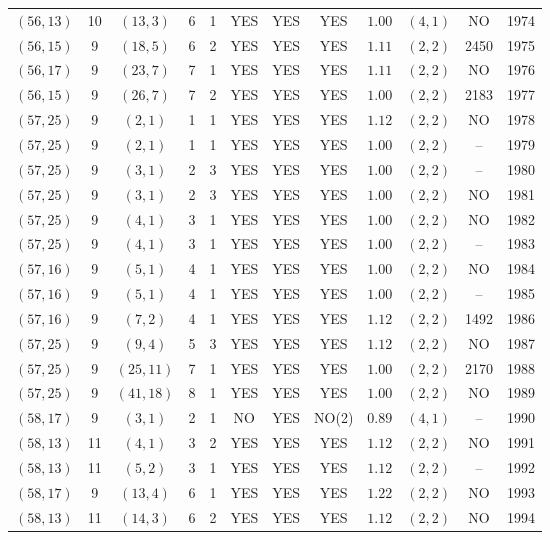 \begin{longtable}{|c|c|c|c|c|c|c|c|c|c|c|c|}
$(56,13)$ & 10 & $(13,3)$ & 6 & 1 & YES & YES & YES & $1.00$ & $(4,1)$ & NO & 1974\\
$(56,15)$ & 9 & $(18,5)$ & 6 & 2 & YES & YES & YES & $1.11$ & $(2,2)$ & 2450 & 1975\\
$(56,17)$ & 9 & $(23,7)$ & 7 & 1 & YES & YES & YES & $1.11$ & $(2,2)$ & NO & 1976\\
$(56,15)$ & 9 & $(26,7)$ & 7 & 2 & YES & YES & YES & $1.00$ & $(2,2)$ & 2183 & 1977\\
$(57,25)$ & 9 & $(2,1)$ & 1 & 1 & YES & YES & YES & $1.12$ & $(2,2)$ & NO & 1978\\
$(57,25)$ & 9 & $(2,1)$ & 1 & 1 & YES & YES & YES & $1.00$ & $(2,2)$ & -- & 1979\\
$(57,25)$ & 9 & $(3,1)$ & 2 & 3 & YES & YES & YES & $1.00$ & $(2,2)$ & -- & 1980\\
$(57,25)$ & 9 & $(3,1)$ & 2 & 3 & YES & YES & YES & $1.00$ & $(2,2)$ & NO & 1981\\
$(57,25)$ & 9 & $(4,1)$ & 3 & 1 & YES & YES & YES & $1.00$ & $(2,2)$ & NO & 1982\\
$(57,25)$ & 9 & $(4,1)$ & 3 & 1 & YES & YES & YES & $1.00$ & $(2,2)$ & -- & 1983\\
$(57,16)$ & 9 & $(5,1)$ & 4 & 1 & YES & YES & YES & $1.00$ & $(2,2)$ & NO & 1984\\
$(57,16)$ & 9 & $(5,1)$ & 4 & 1 & YES & YES & YES & $1.00$ & $(2,2)$ & -- & 1985\\
$(57,16)$ & 9 & $(7,2)$ & 4 & 1 & YES & YES & YES & $1.12$ & $(2,2)$ & 1492 & 1986\\
$(57,25)$ & 9 & $(9,4)$ & 5 & 3 & YES & YES & YES & $1.12$ & $(2,2)$ & NO & 1987\\
$(57,25)$ & 9 & $(25,11)$ & 7 & 1 & YES & YES & YES & $1.00$ & $(2,2)$ & 2170 & 1988\\
$(57,25)$ & 9 & $(41,18)$ & 8 & 1 & YES & YES & YES & $1.00$ & $(2,2)$ & NO & 1989\\
$(58,17)$ & 9 & $(3,1)$ & 2 & 1 & NO & YES & NO(2) & $0.89$ & $(4,1)$ & -- & 1990\\
$(58,13)$ & 11 & $(4,1)$ & 3 & 2 & YES & YES & YES & $1.12$ & $(2,2)$ & NO & 1991\\
$(58,13)$ & 11 & $(5,2)$ & 3 & 1 & YES & YES & YES & $1.12$ & $(2,2)$ & -- & 1992\\
$(58,17)$ & 9 & $(13,4)$ & 6 & 1 & YES & YES & YES & $1.22$ & $(2,2)$ & NO & 1993\\
$(58,13)$ & 11 & $(14,3)$ & 6 & 2 & YES & YES & YES & $1.12$ & $(2,2)$ & NO & 1994\\

\end{longtable}
